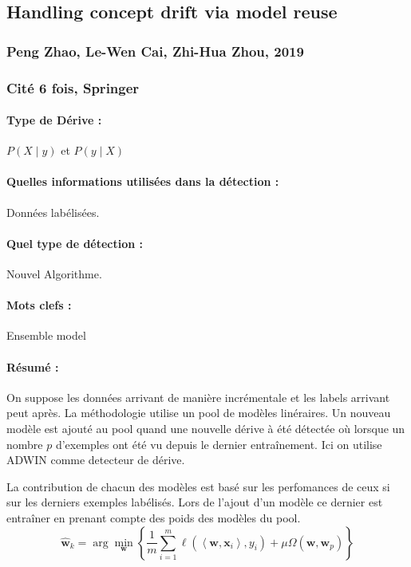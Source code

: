 \documentclass[11pt,a4paper]{report}
\begin{document}
\subsection{Handling concept drift via model reuse}
\subsubsection{Peng Zhao, Le-Wen Cai, Zhi-Hua Zhou, 2019}

\subsubsection{Cité 6 fois, Springer}

\paragraph{Type de Dérive :} $P(X\mid y)$ et $P(y \mid X)$
\paragraph{Quelles informations utilisées dans la détection :} Données labélisées.
\paragraph{Quel type de détection :} Nouvel Algorithme.

\paragraph{Mots clefs :} Ensemble model

\paragraph{Résumé :} On suppose les données arrivant de manière incrémentale et les labels arrivant peut après. La méthodologie utilise un pool de modèles linéraires. Un nouveau modèle est ajouté au pool quand une nouvelle dérive à été détectée où lorsque un nombre $p$ d'exemples ont été vu depuis le dernier entraînement. Ici on utilise ADWIN comme detecteur de dérive. 

La contribution de chacun des modèles est basé sur les perfomances de ceux si sur les derniers exemples labélisés. Lors de l'ajout d'un modèle ce dernier est entraîner en prenant compte des poids des modèles du pool. $$\hat{\mathbf{w}}_{k}=\arg \min _{\mathbf{w}}\left\{\frac{1}{m} \sum_{i=1}^{m} \ell\left(\left\langle\mathbf{w}, \mathbf{x}_{i}\right\rangle, y_{i}\right)+\mu \Omega\left(\mathbf{w}, \mathbf{w}_{p}\right)\right\}$$
\end{document}
